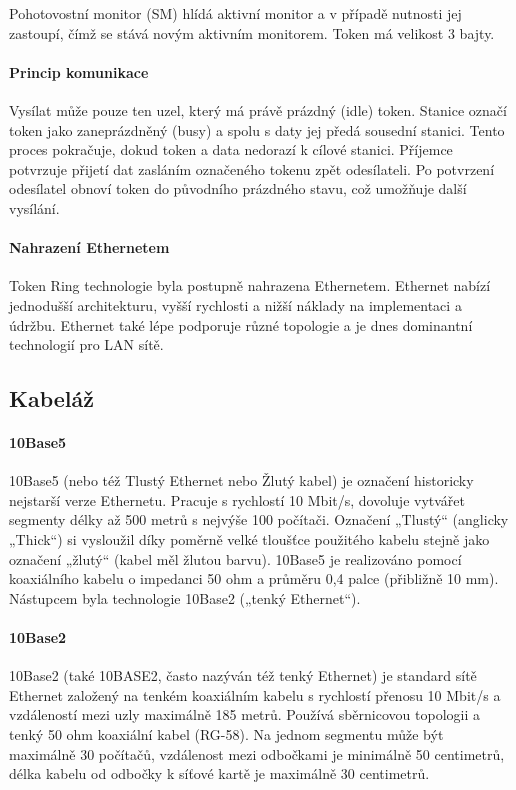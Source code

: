 Pohotovostní monitor (SM) hlídá aktivní monitor a v případě nutnosti jej zastoupí, čímž se stává novým aktivním monitorem. Token má velikost 3 bajty.

\paragraph{Princip komunikace} 
Vysílat může pouze ten uzel, který má právě prázdný (idle) token. Stanice označí token jako zaneprázdněný (busy) a spolu s daty jej předá sousední stanici. Tento proces pokračuje, dokud token a data nedorazí k cílové stanici. Příjemce potvrzuje přijetí dat zasláním označeného tokenu zpět odesílateli. Po potvrzení odesílatel obnoví token do původního prázdného stavu, což umožňuje další vysílání.

\paragraph{Nahrazení Ethernetem} 
Token Ring technologie byla postupně nahrazena Ethernetem. Ethernet nabízí jednodušší architekturu, vyšší rychlosti a nižší náklady na implementaci a údržbu. Ethernet také lépe podporuje různé topologie a je dnes dominantní technologií pro LAN sítě.

\subsection{Kabeláž}
\paragraph{10Base5}
10Base5 (nebo též Tlustý Ethernet nebo Žlutý kabel) je označení historicky nejstarší verze Ethernetu. Pracuje s rychlostí 10 Mbit/s, dovoluje vytvářet segmenty délky až 500 metrů s nejvýše 100 počítači. Označení „Tlustý“ (anglicky „Thick“) si vysloužil díky poměrně velké tloušťce použitého kabelu stejně jako označení „žlutý“ (kabel měl žlutou barvu). 10Base5 je realizováno pomocí koaxiálního kabelu o impedanci 50 ohm a průměru 0,4 palce (přibližně 10 mm). Nástupcem byla technologie 10Base2 („tenký Ethernet“). 

\paragraph{10Base2}
10Base2 (také 10BASE2, často nazýván též tenký Ethernet) je standard sítě Ethernet založený na tenkém koaxiálním kabelu s rychlostí přenosu 10 Mbit/s a vzdáleností mezi uzly maximálně 185 metrů. Používá sběrnicovou topologii a tenký 50 ohm koaxiální kabel (RG-58). Na jednom segmentu může být maximálně 30 počítačů, vzdálenost mezi odbočkami je minimálně 50 centimetrů, délka kabelu od odbočky k síťové kartě je maximálně 30 centimetrů. 

